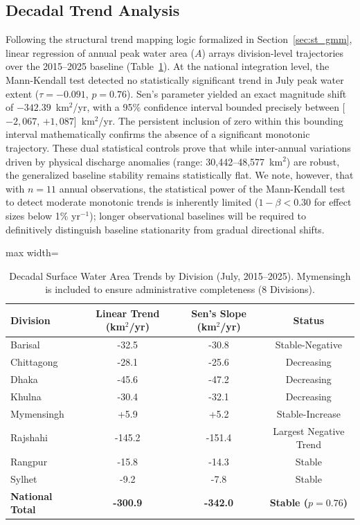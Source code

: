 \documentclass[fleqn,10pt,twocolumn]{article}
\begin{document}
\subsection{Decadal Trend Analysis}

Following the structural trend mapping logic formalized in Section~\ref{sec:st_gmm}, linear regression of annual peak water area ($A$) arrays division-level trajectories over the 2015--2025 baseline (Table~\ref{tab:trend}). At the national integration level, the Mann-Kendall test detected no statistically significant trend in July peak water extent ($\tau = -0.091$, $p = 0.76$). Sen's parameter yielded an exact magnitude shift of $-342.39$~km$^2$/yr, with a 95\% confidence interval bounded precisely between [$-2,067$, $+1,087$]~km$^2$/yr. The persistent inclusion of zero within this bounding interval mathematically confirms the absence of a significant monotonic trajectory. These dual statistical controls prove that while inter-annual variations driven by physical discharge anomalies (range: 30,442--48,577~km$^2$) are robust, the generalized baseline stability remains statistically flat. We note, however, that with $n = 11$ annual observations, the statistical power of the Mann-Kendall test to detect moderate monotonic trends is inherently limited ($1 - \beta < 0.30$ for effect sizes below 1\% yr$^{-1}$); longer observational baselines will be required to definitively distinguish baseline stationarity from gradual directional shifts. 

\begin{table}[htbp]
\centering
\caption{Decadal Surface Water Area Trends by Division (July, 2015--2025). Mymensingh is included to ensure administrative completeness (8 Divisions).}
\label{tab:trend}
\begin{adjustbox}{max width=\linewidth}\begin{tabular}{lccc}
\hline
\textbf{Division} & \textbf{Linear Trend (km$^2$/yr)} & \textbf{Sen's Slope (km$^2$/yr)} & \textbf{Status} \\
\hline
Barisal & -32.5 & -30.8 & Stable-Negative \\
Chittagong & -28.1 & -25.6 & Decreasing \\
Dhaka & -45.6 & -47.2 & Decreasing \\
Khulna & -30.4 & -32.1 & Decreasing \\
Mymensingh & +5.9 & +5.2 & Stable-Increase \\
Rajshahi & -145.2 & -151.4 & Largest Negative Trend \\
Rangpur & -15.8 & -14.3 & Stable \\
Sylhet & -9.2 & -7.8 & Stable \\
\hline
\textbf{National Total} & \textbf{-300.9} & \textbf{-342.0} & \textbf{Stable ($p=0.76$)} \\
\hline
\end{tabular}\end{adjustbox}
\end{table}
\end{document}
